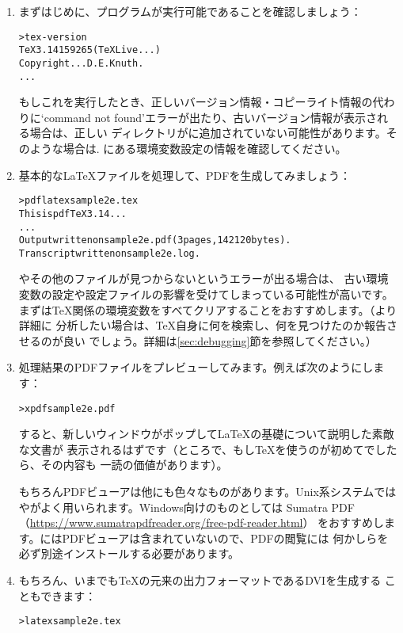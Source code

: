\documentclass[uplatex,dvipdfmx]{jsarticle}
\begin{document}
\begin{enumerate}
\item まずはじめに、プログラムが実行可能であることを確認しましょう：
%
\begin{alltt}
> tex -version
TeX 3.14159265 (TeX Live ...)
Copyright ... D.E. Knuth.
...
\end{alltt}
%
もしこれを実行したとき、正しいバージョン情報・コピーライト情報の代わりに`command
not found'エラーが出たり、古いバージョン情報が表示される場合は、正しい%
ディレクトリがに追加されていない可能性があります。そのような場合は\p.%
\pageref{sec:env}にある環境変数設定の情報を確認してください。

\item 基本的な\LaTeX ファイルを処理して、PDFを生成してみましょう：
%
\begin{alltt}
> pdflatex sample2e.tex
This is pdfTeX 3.14...
...
Output written on sample2e.pdf (3 pages, 142120 bytes).
Transcript written on sample2e.log.
\end{alltt}
%
やその他のファイルが見つからないというエラーが出る場合は、
古い環境変数の設定や設定ファイルの影響を受けてしまっている可能性が高いです。
まずは\TeX 関係の環境変数をすべてクリアすることをおすすめします。（より詳細に
分析したい場合は、\TeX 自身に何を検索し、何を見つけたのか報告させるのが良い
でしょう。詳細は\ref{sec:debugging}節を参照してください。）

\item 処理結果のPDFファイルをプレビューしてみます。例えば次のようにします：
%
\begin{alltt}
> xpdf sample2e.pdf
\end{alltt}
%
すると、新しいウィンドウがポップして\LaTeX の基礎について説明した素敵な文書が
表示されるはずです（ところで、もし\TeX を使うのが初めてでしたら、その内容も
一読の価値があります）。

もちろんPDFビューアは他にも色々なものがあります。Unix系システムでは
やがよく用いられます。Windows向けのものとしては
Sumatra PDF（\url{https://www.sumatrapdfreader.org/free-pdf-reader.html}）
をおすすめします。\TL にはPDFビューアは含まれていないので、PDFの閲覧には
何かしらを必ず別途インストールする必要があります。

\item もちろん、いまでも\TeX の元来の出力フォーマットであるDVIを生成する
こともできます：
%
\begin{alltt}
> latex sample2e.tex
\end{alltt}


\end{enumerate}
\end{document}

